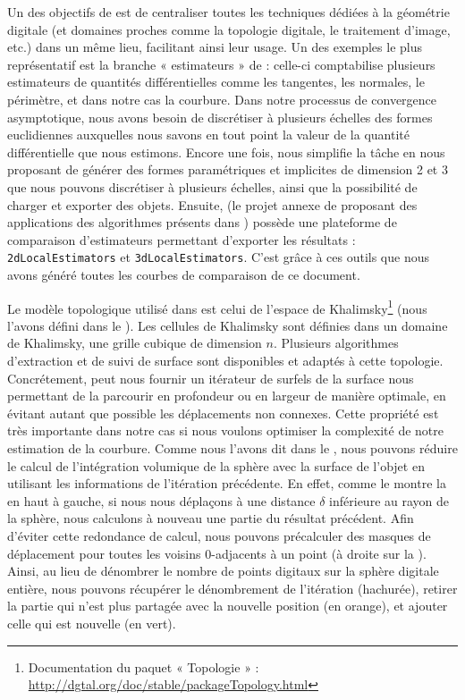 Un des objectifs de \DGtal est de centraliser toutes les techniques dédiées à la
géométrie digitale (et domaines proches comme la topologie digitale, le
traitement d'image, etc.) dans un même lieu, facilitant ainsi leur usage. Un des
exemples le plus représentatif est la branche « estimateurs » de \DGtal :
celle-ci comptabilise plusieurs estimateurs de quantités différentielles comme
les tangentes, les normales, le périmètre, et dans notre cas la courbure. Dans
notre processus de convergence asymptotique, nous avons besoin de discrétiser à
plusieurs échelles des formes euclidiennes auxquelles nous savons en tout point
la valeur de la quantité différentielle que nous estimons. Encore une fois,
\DGtal nous simplifie la tâche en nous proposant de générer des formes
paramétriques et implicites de dimension 2 et 3 que nous pouvons discrétiser à
plusieurs échelles, ainsi que la possibilité de charger et exporter des objets.
Ensuite, \DGtalTools (le projet annexe de \DGtal proposant des applications des
algorithmes présents dans \DGtal) possède une plateforme de comparaison
d'estimateurs permettant d'exporter les résultats : \texttt{2dLocalEstimators}
et \texttt{3dLocalEstimators}. C'est grâce à ces outils que nous avons généré
toutes les courbes de comparaison de ce document.

Le modèle topologique utilisé dans \DGtal est celui de l'espace de
Khalimsky\footnote{Documentation du paquet « Topologie » :
\url{http://dgtal.org/doc/stable/packageTopology.html}} (nous l'avons défini
dans le ). Les cellules de Khalimsky sont définies
dans un domaine de Khalimsky, \cad une grille cubique de dimension $n$.
Plusieurs algorithmes d'extraction et de suivi de surface sont disponibles et
adaptés à cette topologie. Concrétement, \DGtal peut nous fournir un itérateur
de surfels de la surface nous permettant de la parcourir en profondeur ou en
largeur de manière optimale, \cad en évitant autant que possible les
déplacements non connexes. Cette propriété est très importante dans notre cas si
nous voulons optimiser la complexité de notre estimation de la courbure. Comme
nous l'avons dit dans le , nous pouvons réduire le
calcul de l'intégration volumique de la sphère avec la surface de l'objet en
utilisant les informations de l'itération précédente. En effet, comme le montre
la  en haut à gauche, si nous nous déplaçons à une
distance $\delta$ inférieure au rayon de la sphère, nous calculons à nouveau une
partie du résultat précédent. Afin d'éviter cette redondance de calcul, nous
pouvons précalculer des masques de déplacement pour toutes les voisins
$0$-adjacents à un point (à droite sur la ).
Ainsi, au lieu de dénombrer le nombre de points digitaux sur la sphère digitale
entière, nous pouvons récupérer le dénombrement de l'itération (hachurée),
retirer la partie qui n'est plus partagée avec la nouvelle position (en orange),
et ajouter celle qui est nouvelle (en vert).

